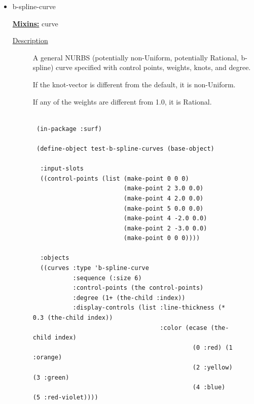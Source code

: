 \documentclass [11pt]{book}
\begin{document}
\begin{itemize}
\begin{figure}
\end{figure}






\item {}b-spline-curve


\textbf{
\underline{Mixins:}} curve





\begin{description}

\item [
\underline{Description}]


A general NURBS (potentially non-Uniform, potentially Rational, b-spline) 
curve specified with control points, weights, knots, and degree.

If the knot-vector is different from the default, it is non-Uniform.

If any of the weights are different from 1.0, it is Rational.



\end{description}




\begin{figure}
\begin{lrbox}{\boxedverb}
\begin{minipage}{\linewidth}
{\small

\begin{verbatim}

 (in-package :surf)

 (define-object test-b-spline-curves (base-object)

  :input-slots
  ((control-points (list (make-point 0 0 0)
                         (make-point 2 3.0 0.0) 
                         (make-point 4 2.0 0.0) 
                         (make-point 5 0.0 0.0) 
                         (make-point 4 -2.0 0.0) 
                         (make-point 2 -3.0 0.0) 
                         (make-point 0 0 0))))
  
  :objects
  ((curves :type 'b-spline-curve
           :sequence (:size 6)
           :control-points (the control-points)
           :degree (1+ (the-child :index))
           :display-controls (list :line-thickness (* 0.3 (the-child index))
                                   :color (ecase (the-child index)
                                            (0 :red) (1 :orange) 
                                            (2 :yellow) (3 :green)
                                            (4 :blue) (5 :red-violet))))


\end{verbatim}}
\end{minipage}
\end{lrbox}
\end{figure}
\end{itemize}
\end{document}
